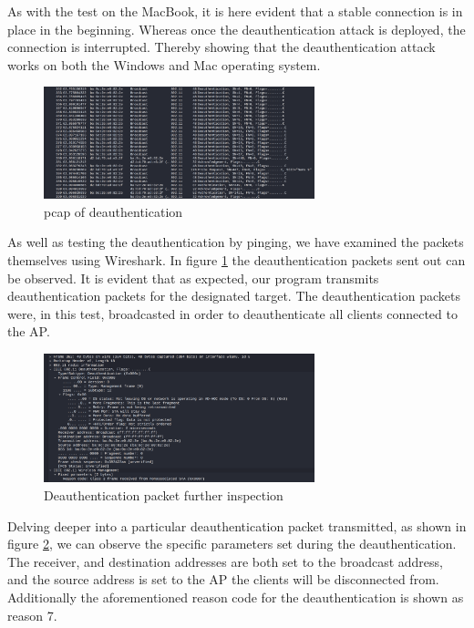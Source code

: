 As with the test on the MacBook, it is here evident that a stable connection is in place in the beginning. Whereas once the deauthentication attack is deployed, the connection is interrupted. Thereby showing that the deauthentication attack works on both the Windows and Mac operating system.

\begin{figure}[H]
    \centering
    \includegraphics[width=0.7\textwidth]{Latex-Files/Billeder/Tests/deauth_pcap.png}
    \caption{pcap of deauthentication}
    \label{deauth_pcap}
\end{figure}

As well as testing the deauthentication by pinging, we have examined the packets themselves using Wireshark. In figure \ref{deauth_pcap} the deauthentication packets sent out can be observed. It is evident that as expected, our program transmits deauthentication packets for the designated target. The deauthentication packets were, in this test, broadcasted in order to deauthenticate all clients connected to the AP. 


\begin{figure}[H]
    \centering
    \includegraphics[width=0.7\textwidth]{Latex-Files/Billeder/Tests/deauth_pcap_packet.png}
    \caption{Deauthentication packet further inspection}
    \label{deauth_pcap_packet}
\end{figure}

Delving deeper into a particular deauthentication packet transmitted, as shown in figure \ref{deauth_pcap_packet}, we can observe the specific parameters set during the deauthentication. The receiver, and destination addresses are both set to the broadcast address, and the source address is set to the AP the clients will be disconnected from. Additionally the aforementioned reason code for the deauthentication is shown as reason 7.


